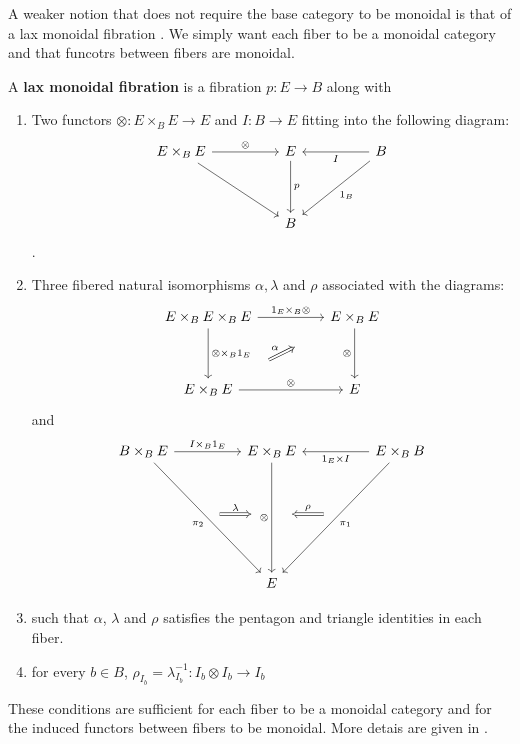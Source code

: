 A weaker notion that does not require the base category to be monoidal is that of a lax monoidal fibration \cite{zawadowski}. We simply want each fiber to be a monoidal category and that funcotrs between fibers are monoidal.
\begin{defn}
A \textbf{lax monoidal fibration} is a fibration $p : E \to B$ along with
\begin{enumerate}
\item Two functors $\otimes : E \times_{B} E \to E$ and $I : B \to E$ fitting into the following diagram:
\[
\ti
E \times_{B} E \ar[r, "\otimes"] \ar[rd] & E \ar[d, "p"] & B \ar[l, "I"] \ar[ld, "1_B"] \\
& B &
\kz
\].
\item Three fibered natural isomorphisms $\alpha, \lambda$ and $\rho$ associated with the diagrams:
\[
\ti
E \times_B E \times_B E \ar[r, "1_E \times_B \otimes"] \ar[d, "\otimes \times_B 1_E"] & E \times_B E \ar[d, "\otimes", swap] \\
E \times_B E \ar[r, "\otimes"] \ar[ru, "\alpha", Rightarrow, shorten <=30pt,shorten >=30pt]  & E
\kz
\]
and
\[
\ti
B \times_B E \ar[r, "I \times_B 1_{E}"] \ar[rdd, "\pi_2",swap] & E \times_B E  \ar[dd, "\otimes",swap] & E \times_B B \ar[ldd, "\pi_1"] \ar[l, "1_E \times I"] \\
\ar[r, "\lambda", xshift=20 pt, Rightarrow, shorten <=30pt, shorten >=30pt] & {}& \ar[l, "\rho", Rightarrow, xshift=-20pt, shorten <=30pt, shorten >=30pt,swap] \\
  & E &  
\kz
\]
\item such that $\alpha$, $\lambda$ and $\rho$ satisfies the pentagon and triangle identities in each fiber.
\item for every $b \in B$, $\rho_{I_b} = \lambda^{-1}_{I_b} : I_b \otimes I_b \to I_b$
\end{enumerate}
\end{defn}
These conditions are sufficient for each fiber to be a monoidal category and for the induced functors between fibers to be monoidal. More detais are given in \cite{zawadowski}.
